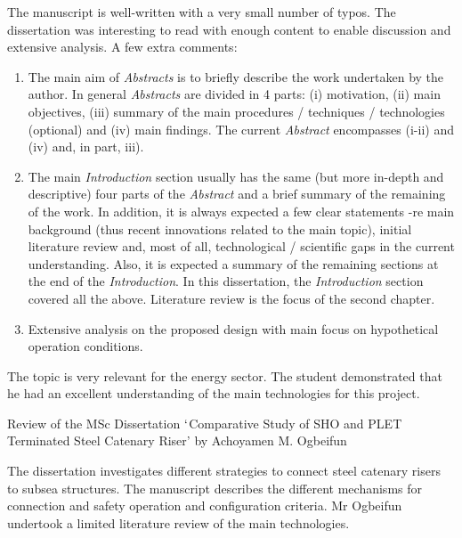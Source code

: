 \documentclass[14pt,twoside]{report}
\begin{document}
The manuscript is well-written with a very small number of typos. The dissertation was interesting to read with enough content to enable discussion and extensive analysis.  A few extra comments:
\begin{enumerate}
%
\item The main aim of {\it Abstracts} is to briefly describe the work undertaken by the author. In general {\it Abstracts} are divided in 4 parts: (i) motivation, (ii) main objectives, (iii) summary of the main procedures / techniques / technologies (optional) and (iv) main findings. The current {\it Abstract} encompasses (i-ii) and (iv) and, in part, iii).
%
\item The main {\it Introduction} section usually has the same (but more in-depth and descriptive) four parts of the {\it Abstract} and a brief summary of the remaining of the work. In addition, it is always expected a few clear statements -re main background (thus recent innovations related to the main topic), initial literature review and, most of all, technological / scientific gaps in the current understanding. Also, it is expected a summary of the remaining sections at the end of the {\it Introduction}. In this dissertation, the {\it Introduction} section covered all the above. Literature review is the focus of the second chapter. 
%
\item Extensive analysis on the proposed design with main focus on hypothetical operation conditions.  
\end{enumerate}

The topic is very relevant for the energy sector. The student demonstrated that he had an excellent  understanding of the main technologies for this project.



\clearpage




\bigskip

\begin{center}
{\Large Review of the MSc Dissertation $\lq$Comparative Study of SHO and PLET Terminated Steel Catenary Riser' by Achoyamen M. Ogbeifun}
\end{center}

\medskip

The dissertation investigates different strategies to connect steel catenary risers to subsea structures. The manuscript describes the different mechanisms for connection and safety operation and configuration criteria. Mr Ogbeifun undertook a limited literature review of the main technologies.
\end{document}
